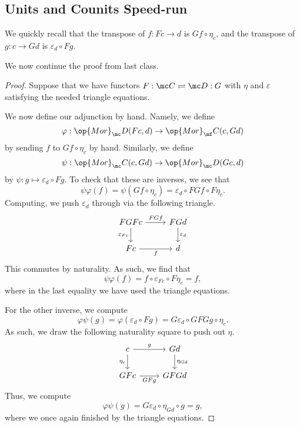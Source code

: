 
\subsection{Units and Counits Speed-run}
We quickly recall that the transpose of $f:Fc\to d$ is $Gf\circ\eta_c$, and the transpose of $g:c\to Gd$ is $\varepsilon_d\circ Fg$.

We now continue the proof from last class.
\adjointbyunits*
\begin{proof}
	Suppose that we have functors $F:\mc C\rightleftharpoons\mc D:G$ with $\eta$ and $\varepsilon$ satisfying the needed triangle equations.

	We now define our adjunction by hand. Namely, we define
	\[\varphi:\op{Mor}_\mc D(Fc,d)\to\op{Mor}_\mf C(c,Gd)\]
	by sending $f$ to $Gf\circ\eta_c$ by hand. Similarly, we define
	\[\psi:\op{Mor}_\mc C(c,Gd)\to\op{Mor}_\mc D(Gc,d)\]
	by $\psi:g\mapsto\varepsilon_d\circ Fg$. To check that these are inverses, we see that
	\[\psi\varphi(f)=\psi(Gf\circ\eta_c)=\varepsilon_d\circ FGf\circ F\eta_c.\]
	Computing, we push $\varepsilon_d$ through via the following triangle.
	\[\begin{tikzcd}
		FGFc & FGd \\
		Fc & d
		\arrow["FGf", from=1-1, to=1-2]
		\arrow["{\varepsilon_d}", from=1-2, to=2-2]
		\arrow["{\varepsilon_{Fc}}"', from=1-1, to=2-1]
		\arrow["f"', from=2-1, to=2-2]
	\end{tikzcd}\]
	This commutes by naturality. As such, we find that
	\[\psi\varphi(f)=f\circ\varepsilon_{Fc}\circ F\eta_c=f,\]
	where in the last equality we have used the triangle equations.

	For the other inverse, we compute
	\[\varphi\psi(g)=\varphi(\varepsilon_d\circ Fg)=G\varepsilon_d\circ GFGg\circ\eta_c.\]
	As such, we draw the following naturality square to push out $\eta$.
	\[\begin{tikzcd}
		c & Gd \\
		GFc & GFGd
		\arrow["{\eta_{Gd}}", from=1-2, to=2-2]
		\arrow["{\eta_c}"', from=1-1, to=2-1]
		\arrow["g", from=1-1, to=1-2]
		\arrow["GFg"', from=2-1, to=2-2]
	\end{tikzcd}\]
	Thus, we compute
	\[\varphi\psi(g)=G\varepsilon_d\circ\eta_{Gd}\circ g=g,\]
	where we once again finished by the triangle equations.


\end{proof}
